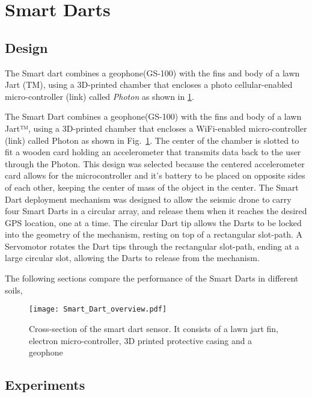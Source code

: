 \section{Smart Darts}\label{sec:SmartDarts}

\subsection{Design}
The Smart dart combines a geophone(GS-100) with the fins and body of a lawn Jart (TM), using a 3D-printed chamber that encloses a photo cellular-enabled micro-controller (link) called \emph{Photon} as shown in \ref{fig:Smart_Dart_overview}.

The Smart Dart combines a geophone(GS-100) with the fins and body of a lawn Jart™, using a 3D-printed chamber that encloses a WiFi-enabled micro-controller (link) called Photon as shown in Fig.~\ref{fig:Smart_Dart_overview}. The center of the chamber is slotted to fit a wooden card holding an accelerometer that transmits data back to the user through the Photon. This design was selected because the centered accelerometer card allows for the microcontroller and it’s battery to be placed on opposite sides of each other, keeping the center of mass of the object in the center. The Smart Dart deployment mechanism was designed to allow the seismic drone to carry four Smart Darts in a circular array, and release them when it reaches the desired GPS location, one at a time. The circular Dart tip allows the Darts to be locked into the geometry of the mechanism, resting on top of a rectangular slot-path. A Servomotor rotates the Dart tips through the rectangular slot-path, ending at a large circular slot, allowing the Darts to release from the mechanism.

The following sections compare the performance of the Smart Darts in different soils, 

\begin{figure} \centering
{\texttt{[image: Smart\_Dart\_overview.pdf]}}
\caption{Cross-section of the smart dart sensor. It consists of a lawn jart fin, electron micro-controller, 3D printed protective casing and a geophone} 
\label{fig:Smart_Dart_overview}
\end{figure}

\subsection{Experiments}
